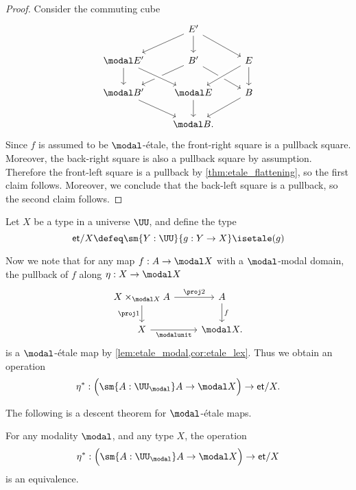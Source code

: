 \documentclass{msc}
\newcommand{\et}{\mathsf{et}}
\begin{document}
\begin{proof}
  Consider the commuting cube
  \begin{equation*}
    \begin{tikzcd}
      &[-.5ex] E' \arrow[dr] \arrow[d] \arrow[dl] \\
      \modal E' \arrow[d] & B' \arrow[dl] \arrow[dr] & E \arrow[dl,crossing over] \arrow[d] \\
      \modal B' \arrow[dr] & \modal E \arrow[d] \arrow[from=ul,crossing over] & B \arrow[dl] \\
      & \modal B.
    \end{tikzcd}
  \end{equation*}
  Since $f$ is assumed to be $\modal$-\'etale, the front-right square is a pullback square. Moreover, the back-right square is also a pullback square by assumption. Therefore the front-left square is a pullback by \cref{thm:etale_flattening}, so the first claim follows. Moreover, we conclude that the back-left square is a pullback, so the second claim follows.
\end{proof}

\begin{defn}
  Let $X$ be a type in a universe $\UU$, and define the type
  \begin{equation*}
    \et/X\defeq \sm{Y:\UU}{g:Y\to X}\isetale(g)
  \end{equation*}
\end{defn}

Now we note that for any map $f:A\to \modal X$ with a $\modal$-modal domain, the pullback of $f$ along $\eta:X\to \modal X$
\begin{equation*}
\begin{tikzcd}
X\times_{\modal X}A \arrow[d,swap,"\proj 1"] \arrow[r,"\proj 2"] & A \arrow[d,"f"] \\
X \arrow[r,swap,"\modalunit"] & \modal X.
\end{tikzcd}
\end{equation*}
is a $\modal$-\'etale map by \cref{lem:etale_modal,cor:etale_lex}. Thus we obtain an operation
\begin{equation*}
  \eta^\ast :\Big(\sm{A:\UU_\modal}A\to\modal X\Big)\to\et/X.
\end{equation*}

The following is a descent theorem for $\modal$-\'etale maps.

\begin{thm}\label{thm:modal_descent}
For any modality $\modal$, and any type $X$, the operation
\begin{equation*}
\eta^\ast:\Big(\sm{A:\UU_\modal}A\to\modal X\Big)\to\et/X
\end{equation*}
is an equivalence.
\end{thm}
\end{document}
